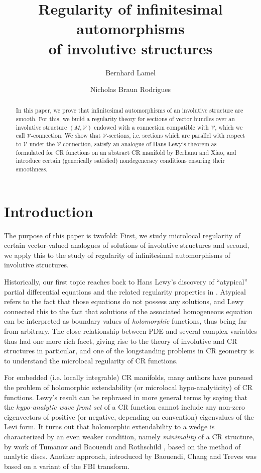 \documentclass[11pt]{amsart}
\title[Regularity of infinitesimal automorphisms of involutive structures]{Regularity of infinitesimal automorphisms \\of involutive structures}
\author{Bernhard Lamel}\email{bernhard.lamel@univie.ac.at}
\author{Nicholas Braun Rodrigues}
\newcommand{\crb}{\mathcal{V}}
\theoremstyle{definition}
\theoremstyle{remark}
\theoremstyle{plain}
\begin{document}
\maketitle

\begin{abstract}
  In this paper, we prove that infinitesimal automorphisms of an involutive structure are
  smooth. For this, we build a regularity theory
  for sections of vector bundles over an involutive structure $(M,\crb)$ endowed
  with a connection compatible with $\crb$, which we call $\crb$-connection. We show that
  $\crb$-sections, i.e. sections which are parallel with respect to $\crb$ under
  the $\crb$-connection, satisfy an analogue of Hans Lewy's theorem as formulated
  for CR functions on an abstract CR manifold by Berhanu and Xiao, and introduce
  certain (generically satisfied) nondegeneracy conditions ensuring their smoothness. 
\end{abstract}

%
\section{Introduction}\label{sec:intro}
%

The purpose of this paper is twofold: First, we study microlocal regularity of certain vector-valued analogues
of solutions of involutive structures and second, we apply this to the study of regularity
of infinitesimal automorphisms of involutive structures. 

Historically, our first topic reaches back to Hans Lewy's
discovery of ``atypical'' partial differential equations and the related
regularity properties in \cite{lewy56}. Atypical refers to the fact
that those equations do not possess any solutions, and Lewy connected this
to the fact that solutions of the associated homogeneous equation can
be interpreted as boundary values of {\em holomorphic} functions, thus being
far from arbitrary. The close relationship between PDE and several complex variables
thus had one more rich facet, giving rise to the theory of involutive and CR structures
in particular, and one of the longstanding problems in CR geometry is to understand the microlocal
regularity of CR functions.

For embedded (i.e. locally integrable) CR manifolds, many authors
have pursued the problem of holomorphic extendability (or microlocal
hypo-analyticity) of CR functions. Lewy's result can be rephrased in
more general terms by saying that the {\em hypo-analytic wave front set} of
a CR function cannot include any non-zero eigenvectors of positive (or negative,
depending on convention) eigenvalues of the Levi form. It turns out that holomorphic
extendability to a wedge is characterized by an even weaker condition, namely
{\em minimality} of a CR structure, by work of Tumanov \cite{tumanov1989} and Baouendi and Rothschild \cite{baouendi1988},
based on the method of analytic discs. Another approach, introduced by  Baouendi, Chang and Treves \cite{baouendi1983} was based
on a variant of the FBI transform.
\end{document}
